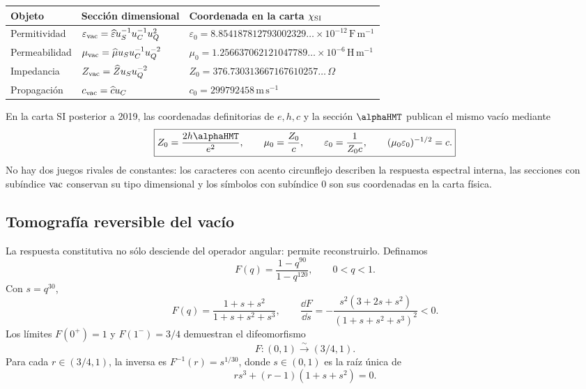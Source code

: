 \begin{center}
\small
\begin{tabularx}{.98\textwidth}{@{}p{}Y Y@{}}
\toprule
Objeto & Sección dimensional & Coordenada en la carta \(\chi_{\rm SI}\)\\
\midrule
Permitividad & \(\varepsilon_{\rm vac}=\widehat\varepsilon u_S^{-1}u_C^{-1}u_Q^2\) &
\(\varepsilon_0=8.854187812793002329\ldots\times10^{-12}\,\mathrm{F\,m^{-1}}\)\\
Permeabilidad & \(\mu_{\rm vac}=\widehat\mu u_Su_C^{-1}u_Q^{-2}\) &
\(\mu_0=1.256637062121047789\ldots\times10^{-6}\,\mathrm{H\,m^{-1}}\)\\
Impedancia & \(Z_{\rm vac}=\widehat Z u_Su_Q^{-2}\) &
\(Z_0=376.730313667167610257\ldots\,\Omega\)\\
Propagación & \(c_{\rm vac}=\widehat c u_C\) &
\(c_0=299792458\,\mathrm{m\,s^{-1}}\)\\
\bottomrule
\end{tabularx}
\end{center}

En la carta SI posterior a 2019, las coordenadas definitorias de \(e,h,c\) y
la sección \(\alphaHMT\) publican el mismo vacío mediante
\begin{equation}
\boxed{
Z_0=\frac{2h\alphaHMT}{e^2},\qquad
\mu_0=\frac{Z_0}{c},\qquad
\varepsilon_0=\frac1{Z_0c},\qquad
(\mu_0\varepsilon_0)^{-1/2}=c.}
\label{p3-83-c31-s2:eq:vacuum-si-closure}
\end{equation}
No hay dos juegos rivales de constantes: los caracteres con acento
circunflejo describen la respuesta espectral interna, las secciones con
subíndice \({\rm vac}\) conservan su tipo dimensional y los símbolos con
subíndice \(0\) son sus coordenadas en la carta física.

\subsection{Tomografía reversible del vacío}

La respuesta constitutiva no sólo desciende del operador angular: permite
reconstruirlo. Definamos
\begin{equation}
F(q)=\frac{1-q^{90}}{1-q^{120}},\qquad 0<q<1.
\label{p3-83-c31-s2:eq:vacuum-F}
\end{equation}
Con \(s=q^{30}\),
\[
F(q)=\frac{1+s+s^2}{1+s+s^2+s^3},
\qquad
\frac{\dd F}{\dd s}
=-\frac{s^2(3+2s+s^2)}{(1+s+s^2+s^3)^2}<0.
\]
Los límites \(F(0^+)=1\) y \(F(1^-)=3/4\) demuestran el difeomorfismo
\begin{equation}
\boxed{F:(0,1)\xrightarrow{\;\sim\;}(3/4,1).}
\label{p3-83-c31-s2:eq:vacuum-F-bijection}
\end{equation}
Para cada \(r\in(3/4,1)\), la inversa es
\(F^{-1}(r)=s^{1/30}\), donde \(s\in(0,1)\) es la raíz única de
\begin{equation}
rs^3+(r-1)(1+s+s^2)=0.
\label{p3-83-c31-s2:eq:vacuum-inverse-cubic}
\end{equation}

